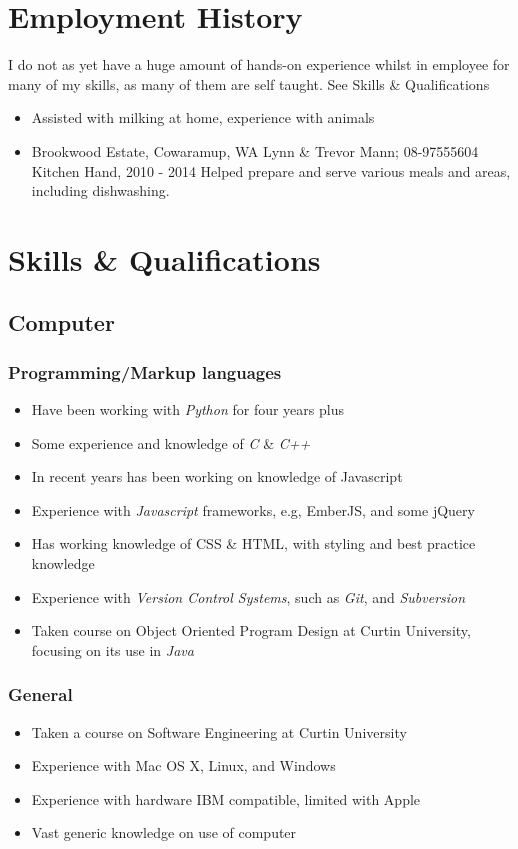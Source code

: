 \documentclass{article}
\begin{document}
\section{Employment History}
  I do not as yet have a huge amount of hands-on experience whilst in employee
  for many of my skills, as many of them are self taught. See Skills \& Qualifications

  \begin{itemize}
    \item Assisted with milking at home, experience with animals
    \item{
      Brookwood Estate, Cowaramup, WA
      Lynn \& Trevor Mann; 08-97555604
      Kitchen Hand, 2010 - 2014
      Helped prepare and serve various meals and areas, including dishwashing.
    }
  \end{itemize}

\section{Skills \& Qualifications}
  \subsection{Computer}
    \subsubsection{Programming/Markup languages}
    \begin{itemize}
      \item Have been working with \emph{Python} for four years plus
      \item Some experience and knowledge of \emph{C} \& \emph{C++}
      \item In recent years has been working on knowledge of Javascript
      \item Experience with \emph{Javascript} frameworks, e.g, EmberJS, and some jQuery
      \item Has working knowledge of CSS \& HTML, with styling and best practice knowledge
      \item Experience with \emph{Version Control Systems}, such as \emph{Git}, and \emph{Subversion}
      \item Taken course on Object Oriented Program Design at Curtin University, focusing on its use in \emph{Java}
    \end{itemize}

    \subsubsection{General}
      \begin{itemize}
        \item Taken a course on Software Engineering at Curtin University
        \item Experience with Mac OS X, Linux, and Windows
        \item Experience with hardware IBM compatible, limited with Apple
        \item Vast generic knowledge on use of computer
      \end{itemize}
\end{document}
